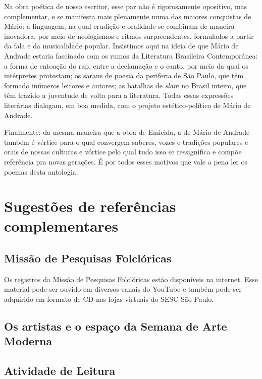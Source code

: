 \documentclass[11pt]{extarticle}
\begin{document}
Na obra poética de nosso escritor, esse par não é rigorosamente
opositivo, mas complementar, e se manifesta mais plenamente numa das
maiores conquistas de Mário: a linguagem, na qual erudição e oralidade
se combinam de maneira inovadora, por meio de neologismos e ritmos
surpreendentes, formulados a partir da fala e da musicalidade popular.
Insistimos aqui na ideia de que Mário de Andrade estaria fascinado com
os rumos da Literatura Brasileira Contemporânea: a forma de entoação do
rap, entre a declamação e o canto, por meio da qual os intérpretes
protestam; os saraus de poesia da periferia de São Paulo, que têm
formado inúmeros leitores e autores; as batalhas de \emph{slam} no
Brasil inteiro, que têm trazido a juventude de volta para a literatura.
Todas essas expressões literárias dialogam, em boa medida, com o projeto
estético-político de Mário de Andrade.

Finalmente: da mesma maneira que a obra de Emicida, a de Mário de
Andrade também é vértice para o qual convergem saberes, vozes e
tradições populares e orais de nossas culturas e vórtice pelo qual tudo
isso se ressignifica e compõe referência pra novas gerações. É por todos
esses motivos que vale a pena ler os poemas desta antologia.

\section{Sugestões de referências complementares}

\subsection{Missão de Pesquisas Folclóricas}

Os registros da Missão de Pesquisas Folclóricas estão disponíveis na
internet. Esse material pode ser ouvido em diversos canais do YouTube e
também pode ser adquirido em formato de CD nas lojas virtuais do SESC
São Paulo.

\subsection{Os artistas e o espaço da Semana de Arte Moderna}



\subsection{Atividade de Leitura}
\end{document}
